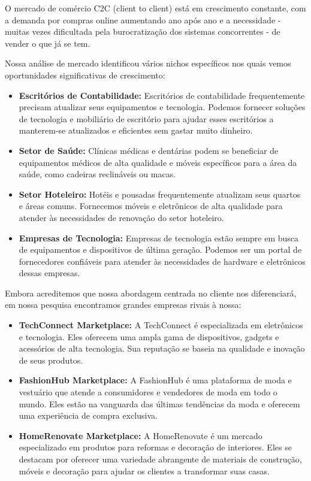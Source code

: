 \documentclass[
	12pt,				%
	openright,			%
	twoside,			%
	a4paper,			%
	english,			%
	brazil				%
	]{abntex2}
\begin{document}
O mercado de comércio C2C (client to client) está em crescimento constante, com a demanda por compras online aumentando ano após ano e a necessidade - muitas vezes dificultada pela burocratização dos sistemas concorrentes - de vender o que já se tem.

Nossa análise de mercado identificou vários nichos específicos nos quais vemos oportunidades significativas de crescimento: 

\begin{itemize}
    \item \textbf{Escritórios de Contabilidade:} Escritórios de contabilidade frequentemente precisam atualizar seus equipamentos e tecnologia. Podemos fornecer soluções de tecnologia e mobiliário de escritório para ajudar esses escritórios a manterem-se atualizados e eficientes sem gastar muito dinheiro.

    \item \textbf{Setor de Saúde:} Clínicas médicas e dentárias podem se beneficiar de equipamentos médicos de alta qualidade e móveis específicos para a área da saúde, como cadeiras reclináveis ou macas.

    \item \textbf{Setor Hoteleiro:} Hotéis e pousadas frequentemente atualizam seus quartos e áreas comuns. Fornecemos móveis e eletrônicos de alta qualidade para atender às necessidades de renovação do setor hoteleiro.

    \item \textbf{Empresas de Tecnologia:} Empresas de tecnologia estão sempre em busca de equipamentos e dispositivos de última geração. Podemos ser um portal de fornecedores confiáveis para atender às necessidades de hardware e eletrônicos dessas empresas.
\end{itemize}

Embora acreditemos que nossa abordagem centrada no cliente nos diferenciará, em nossa pesquisa encontramos grandes empresas rivais à nossa:

\begin{itemize}
	\item \textbf{TechConnect Marketplace:} A TechConnect é especializada em eletrônicos e tecnologia. Eles oferecem uma ampla gama de dispositivos, gadgets e acessórios de alta tecnologia. Sua reputação se baseia na qualidade e inovação de seus produtos.

	\item \textbf{FashionHub Marketplace:} A FashionHub é uma plataforma de moda e vestuário que atende a consumidores e vendedores de moda em todo o mundo. Eles estão na vanguarda das últimas tendências da moda e oferecem uma experiência de compra exclusiva.

	\item \textbf{HomeRenovate Marketplace:} A HomeRenovate é um mercado especializado em produtos para reformas e decoração de interiores. Eles se destacam por oferecer uma variedade abrangente de materiais de construção, móveis e decoração para ajudar os clientes a transformar suas casas.

\end{itemize}
\end{document}
